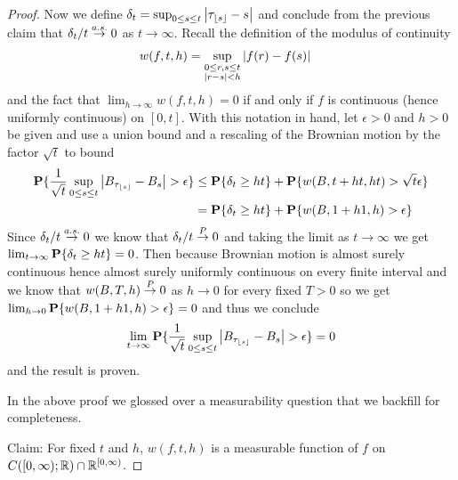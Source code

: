 \begin{proof}
Now we define $\delta_t = \sup_{0 \leq s \leq t}\left \vert \tau_{\lfloor s \rfloor}
  -s \right \vert$ and conclude from the previous claim that $\delta_t /t \overset{a.s.}\to 0$
as $t \to \infty$.  Recall the definition of the modulus of continuity
\begin{align*}
w(f,t,h) &= \sup_{\substack{0 \leq r,s \leq t\\ \left \vert r-s \right \vert < h}} \left \vert f(r) - f(s) \right \vert
\end{align*}
and the fact that $\lim_{h \to \infty} w(f,t,h) = 0$ if and only if
$f$ is continuous (hence uniformly continuous) on $[0,t]$.  With this
notation in hand, let $\epsilon > 0$ and $h > 0$ be given and use a union bound and a
rescaling of the Brownian motion by the factor $\sqrt{t}$ to bound
\begin{align*}
\textbf{P}\{\frac{1}{\sqrt{t}} \sup_{0 \leq s \leq t}
  \left \vert B_{\tau_{\lfloor s \rfloor}} - B_s \right \vert > \epsilon \}
&\leq 
\textbf{P}\{\delta_t \geq  h t\} +
\textbf{P}\{w(B, t + h t, h t) > \sqrt{t} \epsilon\} \\
&=\textbf{P}\{\delta_t \geq  h t\} +
\textbf{P}\{w(B, 1 + h 1, h) > \epsilon\} \\
\end{align*}
Since $\delta_t /t \overset{a.s.}\to 0$ we know that $\delta_t /t \overset{P}\to 0$ and
taking the limit as $t \to \infty$ we get $\lim_{t \to \infty}
\textbf{P}\{\delta_t \geq  h t\}  =0$.  Then because Brownian motion
is almost surely continuous hence almost surely uniformly continuous
on every finite interval and we know that $w(B, T, h) \overset{P}\to 0$ as $h
\to 0$ for every fixed $T > 0$ so we get $\lim_{h \to 0}
\textbf{P}\{w(B, 1 + h 1, h) > \epsilon\} = 0$ and thus we conclude 
\begin{align*}
\lim_{t \to \infty} \textbf{P}\{\frac{1}{\sqrt{t}} \sup_{0 \leq s \leq t}
  \left \vert B_{\tau_{\lfloor s \rfloor}} - B_s \right \vert > \epsilon \} =0
\end{align*}
and the result is proven.

In the above proof we glossed over a measurability question that we
backfill for completeness.

Claim: For fixed $t$ and $h$, $w(f,t,h)$ is a measurable function of
$f$ on $C([0,\infty); \mathbb{R}) \cap \mathbb{R}^{[0,\infty)}$.


\end{proof}

